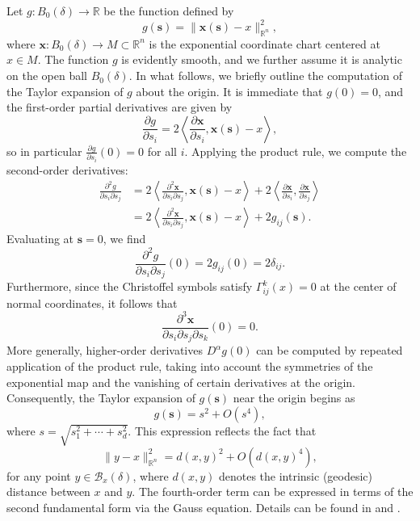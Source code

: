 \documentclass{amsart}
\theoremstyle{Theorem}
\theoremstyle{remark}
\numberwithin{equation}{section} \numberwithin{figure}{section}
\renewcommand*{\to}{\rightarrow}
\begin{document}
Let \( g : B_0(\delta) \to \mathbb{R} \) be the function defined by
\[
g(\mathbf{s}) = \| \mathbf{x}(\mathbf{s}) - x \|_{\mathbb{R}^n}^2,
\]
where \( \mathbf{x} : B_0(\delta) \to M \subset \mathbb{R}^n \) is the exponential coordinate chart centered at \( x \in M \). The function \( g \) is evidently smooth, and we further assume it is analytic on the open ball \( B_0(\delta) \). In what follows, we briefly outline the computation of the Taylor expansion of \( g \) about the origin. It is immediate that \( g(0) = 0 \), and the first-order partial derivatives are given by
\[
\frac{\partial g}{\partial s_i} = 2 \left\langle \frac{\partial \mathbf{x}}{\partial s_i}, \mathbf{x}(\mathbf{s}) - x \right\rangle,
\]
so in particular \( \frac{\partial g}{\partial s_i}(0) = 0 \) for all \( i \). Applying the product rule, we compute the second-order derivatives:
\begin{align*}
\frac{\partial^2 g}{\partial s_i \partial s_j} 
&= 2 \left\langle \frac{\partial^2 \mathbf{x}}{\partial s_i \partial s_j}, \mathbf{x}(\mathbf{s}) - x \right\rangle 
+ 2 \left\langle \frac{\partial \mathbf{x}}{\partial s_i}, \frac{\partial \mathbf{x}}{\partial s_j} \right\rangle \\
&= 2 \left\langle \frac{\partial^2 \mathbf{x}}{\partial s_i \partial s_j}, \mathbf{x}(\mathbf{s}) - x \right\rangle 
+ 2 g_{ij}(\mathbf{s}).
\end{align*}
Evaluating at \( \mathbf{s} = 0 \), we find
\[
\frac{\partial^2 g}{\partial s_i \partial s_j}(0) = 2 g_{ij}(0) = 2 \delta_{ij}.
\]
Furthermore, since the Christoffel symbols satisfy \( \Gamma_{ij}^{k}(x) = 0 \) at the center of normal coordinates, it follows that
\[
\frac{\partial^3 \mathbf{x}}{\partial s_i \partial s_j \partial s_k}(0) = 0.
\]
More generally, higher-order derivatives \( D^\alpha g(0) \) can be computed by repeated application of the product rule, taking into account the symmetries of the exponential map and the vanishing of certain derivatives at the origin. Consequently, the Taylor expansion of \( g(\mathbf{s}) \) near the origin begins as
\[
g(\mathbf{s}) = s^2 + O(s^4),
\]
where \( s = \sqrt{s_1^2 + \cdots + s_d^2} \). This expression reflects the fact that
\[
\| y - x \|_{\mathbb{R}^n}^2 = d(x, y)^2 + O(d(x, y)^4),
\]
for any point \( y \in \mathcal{B}_x(\delta) \), where \( d(x, y) \) denotes the intrinsic (geodesic) distance between \( x \) and \( y \). The fourth-order term can be expressed in terms of the second fundamental form via the Gauss equation. Details can be found in \cite{S1} and \cite{S2}.
\end{document}
